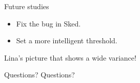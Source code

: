 \documentclass{beamer}
\begin{document}
    \begin{frame}{Future studies}
        \begin{itemize}[<+-|alert@+>]
            \item Fix the bug in Sked.
            \item Set a more intelligent threshold.
        \end{itemize}
    \end{frame}
    \begin{frame}
        \centering
        Lina's picture that shows a wide variance!
    \end{frame}
    \begin{frame}{Questions?}
        \centering
        Questions?
    \end{frame}
\end{document}
